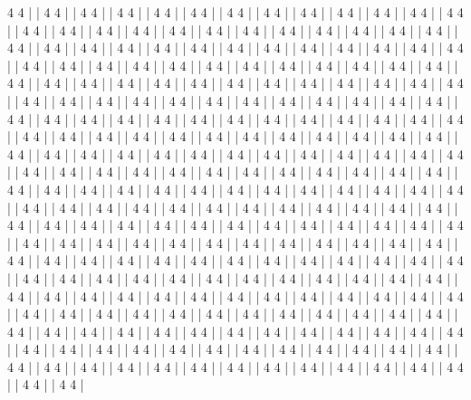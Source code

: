 4   4
|   |
4   4
|   |
4   4
|   |
4   4
|   |
4   4
|   |
4   4
|   |
4   4
|   |
4   4
|   |
4   4
|   |
4   4
|   |
4   4
|   |
4   4
|   |
4   4
|   |
4   4
|   |
4   4
|   |
4   4
|   |
4   4
|   |
4   4
|   |
4   4
|   |
4   4
|   |
4   4
|   |
4   4
|   |
4   4
|   |
4   4
|   |
4   4
|   |
4   4
|   |
4   4
|   |
4   4
|   |
4   4
|   |
4   4
|   |
4   4
|   |
4   4
|   |
4   4
|   |
4   4
|   |
4   4
|   |
4   4
|   |
4   4
|   |
4   4
|   |
4   4
|   |
4   4
|   |
4   4
|   |
4   4
|   |
4   4
|   |
4   4
|   |
4   4
|   |
4   4
|   |
4   4
|   |
4   4
|   |
4   4
|   |
4   4
|   |
4   4
|   |
4   4
|   |
4   4
|   |
4   4
|   |
4   4
|   |
4   4
|   |
4   4
|   |
4   4
|   |
4   4
|   |
4   4
|   |
4   4
|   |
4   4
|   |
4   4
|   |
4   4
|   |
4   4
|   |
4   4
|   |
4   4
|   |
4   4
|   |
4   4
|   |
4   4
|   |
4   4
|   |
4   4
|   |
4   4
|   |
4   4
|   |
4   4
|   |
4   4
|   |
4   4
|   |
4   4
|   |
4   4
|   |
4   4
|   |
4   4
|   |
4   4
|   |
4   4
|   |
4   4
|   |
4   4
|   |
4   4
|   |
4   4
|   |
4   4
|   |
4   4
|   |
4   4
|   |
4   4
|   |
4   4
|   |
4   4
|   |
4   4
|   |
4   4
|   |
4   4
|   |
4   4
|   |
4   4
|   |
4   4
|   |
4   4
|   |
4   4
|   |
4   4
|   |
4   4
|   |
4   4
|   |
4   4
|   |
4   4
|   |
4   4
|   |
4   4
|   |
4   4
|   |
4   4
|   |
4   4
|   |
4   4
|   |
4   4
|   |
4   4
|   |
4   4
|   |
4   4
|   |
4   4
|   |
4   4
|   |
4   4
|   |
4   4
|   |
4   4
|   |
4   4
|   |
4   4
|   |
4   4
|   |
4   4
|   |
4   4
|   |
4   4
|   |
4   4
|   |
4   4
|   |
4   4
|   |
4   4
|   |
4   4
|   |
4   4
|   |
4   4
|   |
4   4
|   |
4   4
|   |
4   4
|   |
4   4
|   |
4   4
|   |
4   4
|   |
4   4
|   |
4   4
|   |
4   4
|   |
4   4
|   |
4   4
|   |
4   4
|   |
4   4
|   |
4   4
|   |
4   4
|   |
4   4
|   |
4   4
|   |
4   4
|   |
4   4
|   |
4   4
|   |
4   4
|   |
4   4
|   |
4   4
|   |
4   4
|   |
4   4
|   |
4   4
|   |
4   4
|   |
4   4
|   |
4   4
|   |
4   4
|   |
4   4
|   |
4   4
|   |
4   4
|   |
4   4
|   |
4   4
|   |
4   4
|   |
4   4
|   |
4   4
|   |
4   4
|   |
4   4
|   |
4   4
|   |
4   4
|   |
4   4
|   |
4   4
|   |
4   4
|   |
4   4
|   |
4   4
|   |
4   4
|   |
4   4
|   |
4   4
|   |
4   4
|   |
4   4
|   |
4   4
|   |
4   4
|   |
4   4
|   |
4   4
|   |
4   4
|   |
4   4
|   |
4   4
|   |
4   4
|   |
4   4
|   |
4   4
|   |
4   4
|   |
4   4
|   |
4   4
|   |
4   4
|   |
4   4
|   |
4   4
|   |
4   4
|   |
4   4
|   |
4   4
|   |
4   4
|   |
4   4
|   |
4   4
|   |
4   4
|   |
4   4
|   |
4   4
|   |
4   4
|   |
4   4
|   |
4   4
|   |
4   4
|   |
4   4
|   |
4   4
|   |
4   4
|   |
4   4
|   |
4   4
|   |
4   4
|   |
4   4
|   |
4   4
|   |
4   4
|   |
4   4
|   |
4   4
|   |
4   4
|   |
4   4
|   |
4   4
|   |
4   4
|   |
4   4
|   |
4   4
|   |
4   4
|   |
4   4
|   |
4   4
|   |
4   4
|   |
4   4
|   |
4   4
|   |
4   4
|   |
4   4
|   |
4   4
|   |
4   4
|   |
4   4
|   |
4   4
|   |
4   4
|   |
4   4
|   |
4   4
|   |
4   4
|   |
4   4
|   |
4   4
|   |
4   4
|   |
4   4
|   |
4   4
|   |
4   4
|   |
4   4
|   |
4   4
|   |
4   4
|   |
4   4
|   |
4   4
|   |
4   4
|   |
4   4
|   |
4   4
|   |
4   4
|   |
4   4
|   |
4   4
|